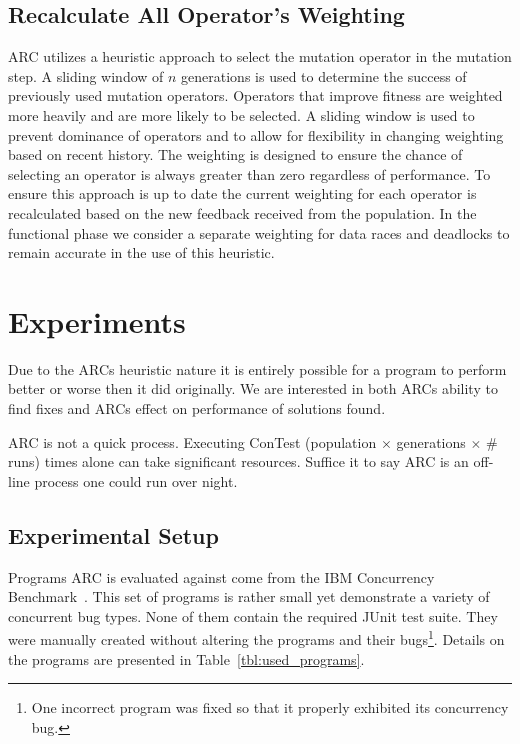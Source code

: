 \documentclass{llncs}
\begin{document}

\subsection{Recalculate All Operator's Weighting}
\label{sec:recalculate_operator_weighting}

ARC utilizes a heuristic approach to select the mutation operator in the
mutation step. A sliding window of $n$ generations is used to determine the
success of previously used mutation operators. Operators that improve fitness
are weighted more heavily and are more likely to be selected. A sliding window
is used to prevent dominance of operators and to allow for flexibility in
changing weighting based on recent history. The weighting is designed to ensure
the chance of selecting an operator is always greater than zero regardless of
performance. To ensure this approach is up to date the current weighting for
each operator is recalculated based on the new feedback received from the
population. In the functional phase we consider a separate weighting for data
races and deadlocks to remain accurate in the use of this heuristic.

\section{Experiments}
\label{sec:experiments}

Due to the ARCs heuristic nature it is entirely possible for a program to
perform better or worse then it did originally. We are interested in both ARCs
ability to find fixes and ARCs effect on performance of solutions found.

ARC is not a quick process. Executing ConTest (population $\times$ generations
$\times$ \# runs) times alone can take significant resources. Suffice it to say
ARC is an off-line process one could run over night.

\subsection{Experimental Setup}
\label{sec:experimental_setup}

Programs ARC is evaluated against come from the IBM Concurrency
Benchmark~\cite{EHSU06}. This set of programs is rather small yet demonstrate a
variety of concurrent bug types. None of them contain the required JUnit test
suite. They were manually created without altering the programs and their
bugs\footnote{One incorrect program was fixed so that it properly exhibited its
concurrency bug.}. Details on the programs are presented in
Table~\ref{tbl:used_programs}.
\end{document}
